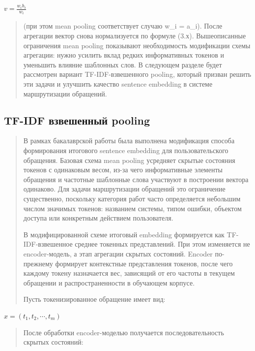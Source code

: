 \(v = \frac{w_{i}h_{i}}{w_{i}}\)

\begin{quote}
(при этом mean pooling соответствует случаю w\_i = a\_i). После
агрегации вектор снова нормализуется по формуле (3.х). Вышеописанные
ограничения mean pooling показывают необходимость модификации схемы
агрегации: нужно усилить вклад редких информативных токенов и уменьшить
влияние шаблонных слов. В следующем разделе будет рассмотрен вариант
TF-IDF-взвешенного pooling, который призван решить эти задачи и улучшить
качество sentence embedding в системе маршрутизации обращений.
\end{quote}

\hypertarget{tf-idf-ux432ux437ux432ux435ux448ux435ux43dux43dux44bux439-pooling}{%
\subsection{TF-IDF взвешенный
pooling}\label{tf-idf-ux432ux437ux432ux435ux448ux435ux43dux43dux44bux439-pooling}}

\begin{quote}
В рамках бакалаврской работы была выполнена модификация способа
формирования итогового sentence embedding для пользовательского
обращения. Базовая схема mean pooling усредняет скрытые состояния
токенов с одинаковым весом, из-за чего информативные элементы обращения
и частотные шаблонные слова участвуют в построении вектора одинаково.
Для задачи маршрутизации обращений это ограничение существенно,
поскольку категория работ часто определяется небольшим числом значимых
токенов: названием системы, типом ошибки, объектом доступа или
конкретным действием пользователя.

В модифицированной схеме итоговый embedding формируется как
TF-IDF-взвешенное среднее токенных представлений. При этом изменяется не
encoder-модель, а этап агрегации скрытых состояний. Encoder по-прежнему
формирует контекстные представления токенов, после чего каждому токену
назначается вес, зависящий от его частоты в текущем обращении и
распространенности в обучающем корпусе.

Пусть токенизированное обращение имеет вид:
\end{quote}

\(x = \left( t_{1},t_{2},\cdots,t_{m} \right)\)

\begin{quote}
После обработки encoder-моделью получается последовательность скрытых
состояний:
\end{quote}

